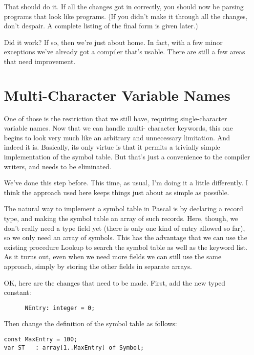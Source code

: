 That should do  it. If  all  the changes got in correctly, you should now be parsing programs that look like programs. (If you didn't  make  it  through all the  changes, don't  despair. A complete listing of the final form is given later.)

Did it work?  If so, then we're just about home. In fact, with a few minor  exceptions we've already got a compiler that's usable. There are still a few areas that need improvement.

\section{Multi-Character Variable Names}

One of those is  the  restriction  that  we still have, requiring single-character variable names. Now that we can handle multi- character keywords, this one  begins  to  look  very much like an arbitrary  and  unnecessary  limitation. And  indeed   it  is. Basically, its only virtue is  that it permits a trivially simple implementation  of  the   symbol   table. But  that's  just  a convenience to the compiler writers, and needs to be eliminated.

We've done this step before. This time, as usual, I'm doing it a little differently. I think  the approach used here keeps things just about as simple as possible.

The natural  way  to  implement  a  symbol  table in Pascal is by declaring a record type, and making the symbol table an  array of such records. Here, though, we don't really need  a  type  field yet  (there is only one kind of entry allowed so far), so we only need an array of symbols. This has the advantage that we can use the existing procedure Lookup to  search the symbol table as well as the  keyword  list. As it turns out, even when we need more fields we can still use the same approach, simply by  storing the other fields in separate arrays.

OK, here are the changes that  need  to  be made. First, add the new typed constant:

\begin{verbatim}
      NEntry: integer = 0;
\end{verbatim}

Then change the definition of the symbol table as follows:

\begin{verbatim}
const MaxEntry = 100;
var ST   : array[1..MaxEntry] of Symbol;
\end{verbatim}

